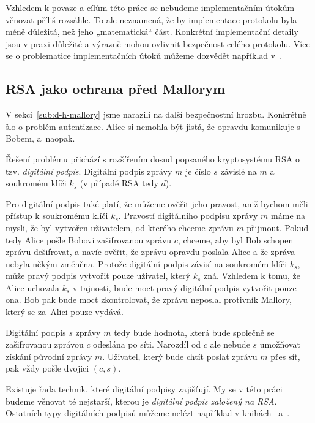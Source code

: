 \documentclass[
  program=infoi,
  biblatex=false,
  figures=true,
  glossaries,
  tables=false,
  sourcecodes=true,
  index
]{kidiplom}
\begin{document}
        \begin{remark}
            Vzhledem k povaze a cílům této práce se nebudeme implementačním útokům věnovat příliš rozsáhle.
            To ale neznamená, že by implementace protokolu byla méně důležitá, než jeho „matematická“ část.
            Konkrétní implementační detaily jsou v praxi důležité a výrazně mohou ovlivnit bezpečnost celého protokolu.
            Více se o problematice implementačních útoků můžeme dozvědět například v~\cite{rsa-and-public}.
        \end{remark}
        

\subsection{RSA jako ochrana před Mallorym}

    V sekci~\ref{sub:d-h-mallory} jsme narazili na další bezpečnostní hrozbu.
    Konkrétně šlo o problém autentizace.
    Alice si nemohla být jistá, že opravdu komunikuje s Bobem, a~naopak.

    Řešení problému přichází s rozšířením dosud popsaného kryptosystému RSA o tzv. \emph{digitální podpis}.
    Digitální podpis zprávy $m$ je číslo $s$ závislé na $m$ a soukromém klíči $k_s$ (v případě RSA tedy $d$).

    Pro digitální podpis také platí, že můžeme ověřit jeho pravost, aniž bychom měli přístup k soukromému klíči $k_s$.
    Pravostí digitálního podpisu zprávy $m$ máme na mysli, že byl vytvořen uživatelem, od kterého chceme zprávu $m$ přijmout.
    Pokud tedy Alice pošle Bobovi zašifrovanou zprávu $c$, chceme, aby byl Bob schopen zprávu dešifrovat,
    a navíc ověřit, že zprávu opravdu poslala Alice a že zpráva nebyla někým změněna.
    Protože digitální podpis závisí na soukromém klíči $k_s$, může pravý podpis vytvořit pouze uživatel, který $k_s$ zná.
    Vzhledem k tomu, že Alice uchovala $k_s$ v tajnosti, bude moct pravý digitální podpis vytvořit pouze ona.
    Bob pak bude moct zkontrolovat, že zprávu neposlal protivník Mallory, který se za~Alici pouze vydává.
    
    Digitální podpis $s$ zprávy $m$ tedy bude hodnota, která bude společně se zašifrovanou zprávou $c$ odeslána po síti.
    Narozdíl od $c$ ale nebude $s$ umožňovat získání původní zprávy $m$.
    Uživatel, který bude chtít poslat zprávu $m$ přes síť, pak vždy pošle dvojici $(c,s)$.

    Existuje řada technik, které digitální podpisy zajišťují.
    My se v této práci budeme věnovat té nejstarší, kterou je \emph{digitální podpis založený na RSA}.
    Ostatních typy digitálních podpisů můžeme nelézt například v knihách~\cite{theory-and-practice} a~\cite{handbook}.
\end{document}
